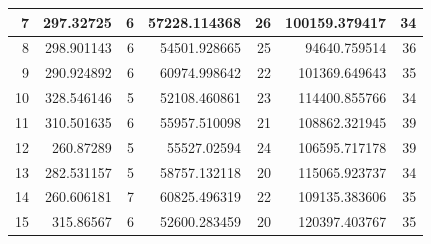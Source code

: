 \begin{table}
\begin{adjustwidth}{}{}
{{\begin{tabular}{|r|r|r|r|r|r|r|}
\hline
7                                          & 297.32725                    & 6                                     & 57228.114368                   & 26                                    & 100159.379417                & 34                                     \\ 
\hline
8                                          & 298.901143                   & 6                                     & 54501.928665                   & 25                                    & 94640.759514                 & 36                                     \\ 
\hline
9                                          & 290.924892                   & 6                                     & 60974.998642                   & 22                                    & 101369.649643                & 35                                     \\ 
\hline
10                                         & 328.546146                   & 5                                     & 52108.460861                   & 23                                    & 114400.855766                & 34                                     \\ 
\hline
11                                         & 310.501635                   & 6                                     & 55957.510098                   & 21                                    & 108862.321945                & 39                                     \\ 
\hline
12                                         & 260.87289                    & 5                                     & 55527.02594                    & 24                                    & 106595.717178                & 39                                     \\ 
\hline
13                                         & 282.531157                   & 5                                     & 58757.132118                   & 20                                    & 115065.923737                & 34                                     \\ 
\hline
14                                         & 260.606181                   & 7                                     & 60825.496319                   & 22                                    & 109135.383606                & 35                                     \\ 
\hline
15                                         & 315.86567                    & 6                                     & 52600.283459                   & 20                                    & 120397.403767                & 35                                     \\ 

\end{tabular}}}
\end{adjustwidth}
\end{table}
